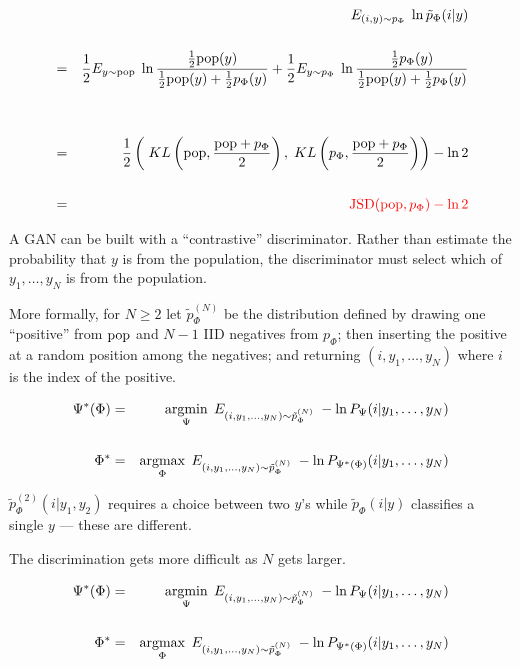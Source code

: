 {\begin{eqnarray*}
& & E_{(i,y) \sim  p_\Phi}\;\ln \tilde{p}_\Phi(i|y) \\
\\
& = & \frac{1}{2} E_{y \sim \mathrm{pop}}\; \ln \frac{\frac{1}{2}\mathrm{pop}(y)}{\frac{1}{2}\mathrm{pop}(y) + \frac{1}{2} p_\Phi(y)} + \frac{1}{2} E_{y \sim p_\Phi}\;\ln \frac{\frac{1}{2}p_\Phi(y)}{\frac{1}{2}\mathrm{pop}(y) + \frac{1}{2}p_\Phi(y)} \\
\\
\\
& = & \frac{1}{2} \left(\;KL\left(\mathrm{pop},\frac{\mathrm{pop}+p_\Phi}{2}\right),\;KL\left(p_\Phi,\frac{\mathrm{pop}+p_\Phi}{2}\right)\right) - \ln 2 \\
\\
& = & {\color{red} \mathrm{JSD}(\mathrm{pop},p_\Phi) - \ln 2}
\end{eqnarray*}


A GAN can be built with a ``contrastive'' discriminator.  Rather than estimate the probability that $y$ is from the population, the discriminator must select which
of $y_1,\ldots,y_N$ is from the population.

\vfill
More formally, for $N \geq 2$ let {\color{red} $\tilde{p}_\Phi^{(N)}$} be the distribution defined by drawing one ``positive'' from $\mathrm{pop}$ and $N-1$ IID negatives from $p_\Phi$;
then inserting the positive at a random position among the negatives; and returning $(i,y_1,\ldots,y_N)$ where
$i$ is the index of the positive.


\begin{eqnarray*}
\Psi^*(\Phi) & = & \operatorname*{argmin}_\Psi\; E_{(i,y_1,\ldots,y_{N})\sim \tilde{p}_\Phi^{(N)}} \;- \ln P_\Psi(i|y_1,\ldots,y_{N}) \\
\\
\Phi^* & = & \operatorname*{argmax}_\Phi\; E_{(i,y_1,\ldots,y_{N})\sim \tilde{p}_\Phi^{(N)}} \;- \ln P_{\Psi^*(\Phi)}(i|y_1,\ldots,y_{N})
\end{eqnarray*}

\vfill
{\color{red} $\tilde{p}_\Phi^{(2)}(i|y_1,y_2)$} requires a choice between two $y$'s while {\color{red} $\tilde{p}_\Phi(i|y)$} classifies a single $y$ --- these are different.

\vfill
The discrimination gets more difficult as $N$ gets larger.


\begin{eqnarray*}
\Psi^*(\Phi) & = & \operatorname*{argmin}_\Psi\; E_{(i,y_1,\ldots,y_{N})\sim \tilde{p}_\Phi^{(N)}} \;- \ln P_\Psi(i|y_1,\ldots,y_{N}) \\
\\
\Phi^* & = & \operatorname*{argmax}_\Phi\; E_{(i,y_1,\ldots,y_{N})\sim \tilde{p}_\Phi^{(N)}} \;- \ln P_{\Psi^*(\Phi)}(i|y_1,\ldots,y_{N})
\end{eqnarray*}

}

